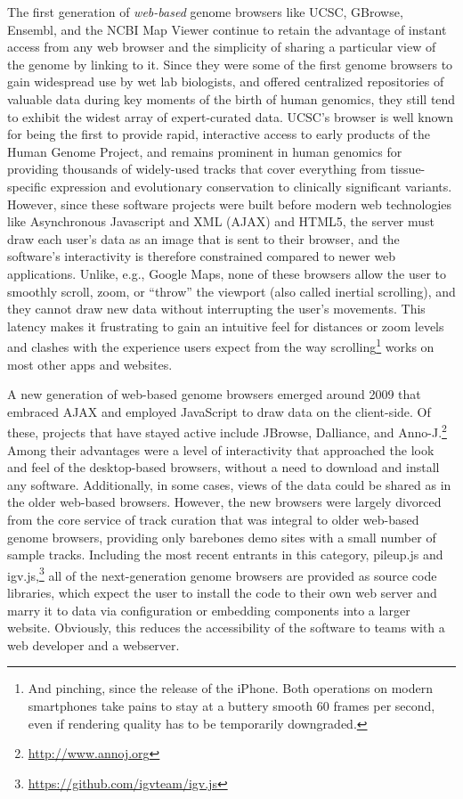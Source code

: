 The first generation of \emph{web-based} genome browsers like UCSC,\autocite{Dreszer2011} GBrowse,\autocite{Stein2002} Ensembl,\autocite{Stalker2004} and the NCBI Map Viewer\autocite{Wheeler2003} continue to retain the advantage of instant access from any web browser and the simplicity of sharing a particular view of the genome by linking to it. Since they were some of the first genome browsers to gain widespread use by wet lab biologists, and offered centralized repositories of valuable data during key moments of the birth of human genomics, they still tend to exhibit the widest array of expert-curated data. UCSC's browser is well known for being the first to provide rapid, interactive access to early products of the Human Genome Project,\autocite{Kent2002} and remains prominent in human genomics for providing thousands of widely-used tracks that cover everything from tissue-specific expression and evolutionary conservation to clinically significant variants. However, since these software projects were built before modern web technologies like Asynchronous Javascript and XML (AJAX)\autocite{Paulson2005} and HTML5, the server must draw each user's data as an image that is sent to their browser, and the software's interactivity is therefore constrained compared to newer web applications. Unlike, e.g., Google Maps, none of these browsers allow the user to smoothly scroll, zoom, or ``throw'' the viewport (also called inertial scrolling), and they cannot draw new data without interrupting the user's movements. This latency makes it frustrating to gain an intuitive feel for distances or zoom levels and clashes with the experience users expect from the way scrolling\footnote{And pinching, since the release of the iPhone. Both operations on modern smartphones take pains to stay at a buttery smooth 60 frames per second, even if rendering quality has to be temporarily downgraded.} works on most other apps and websites.

A new generation of web-based genome browsers emerged around 2009 that embraced AJAX and employed JavaScript to draw data on the client-side. Of these, projects that have stayed active include JBrowse,\autocite{Buels2016} Dalliance,\autocite{Down2011} and Anno-J.\footnote{\url{http://www.annoj.org}} Among their advantages were a level of interactivity that approached the look and feel of the desktop-based browsers, without a need to download and install any software. Additionally, in some cases, views of the data could be shared as in the older web-based browsers. However, the new browsers were largely divorced from the core service of track curation that was integral to older web-based genome browsers, providing only barebones demo sites with a small number of sample tracks. Including the most recent entrants in this category, pileup.js\autocite{Vanderkam2016} and igv.js,\footnote{\url{https://github.com/igvteam/igv.js}} all of the next-generation genome browsers are provided as source code libraries, which expect the user to install the code to their own web server and marry it to data via configuration or embedding components into a larger website. Obviously, this reduces the accessibility of the software to teams with a web developer and a webserver.

